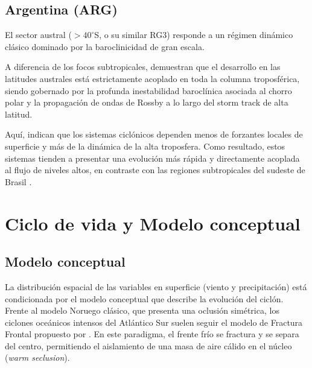 \subsection{Argentina (ARG)}\label{subsec:tb_arg}
El sector austral ($>40^\circ$S, o su similar RG3) responde a un régimen dinámico clásico dominado por la baroclinicidad de gran escala. 

A diferencia de los focos subtropicales, \citet{hoskins2005new} demuestran que el desarrollo en las latitudes australes está estrictamente acoplado en toda la columna troposférica, siendo gobernado por la profunda inestabilidad baroclínica asociada al chorro polar y la propagación de ondas de Rossby a lo largo del storm track de alta latitud.

Aquí, \citet{simmonds2000variability} indican que los sistemas ciclónicos dependen menos de forzantes locales de superficie y más de la dinámica de la alta troposfera. Como resultado, estos sistemas tienden a presentar una evolución más rápida y directamente acoplada al flujo de niveles altos, en contraste con las regiones subtropicales del sudeste de Brasil \citep{vera2002cold}.

\section{Ciclo de vida y Modelo conceptual}\label{sec:tb_evolucion}

\subsection{Modelo conceptual}\label{subsec:tb_modelos}
La distribución espacial de las variables en superficie (viento y precipitación) está condicionada por el modelo conceptual que describe la evolución del ciclón. Frente al modelo Noruego clásico, que presenta una oclusión simétrica, los ciclones oceánicos intensos del Atlántico Sur suelen seguir el modelo de Fractura Frontal propuesto por \citet{shapiro1990life}. En este paradigma, el frente frío se fractura y se separa del centro, permitiendo el aislamiento de una masa de aire cálido en el núcleo (\textit{warm seclusion}).

